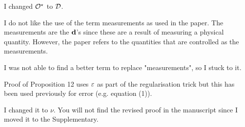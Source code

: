\AR I changed $\mathcal{O}^\star$ to $\mathcal{D}$.


  
\RC I do not like the use of the term measurements as used in the
paper. The measurements are the $\mathbf{d}$’s since these are a result of
measuring a physical quantity. However, the paper refers to the
quantities that are controlled as the measurements.

\AR I was not able to find a better term to replace "measurements", so
I stuck to it.

  
\RC Proof of Proposition 12 uses $\varepsilon$ as part of the regularisation
trick but this has been used previously for error (e.g. equation (1)).
  
\AR I changed it to $\nu$. You will not find the revised proof in the
manuscript since I moved it to the Supplementary.


